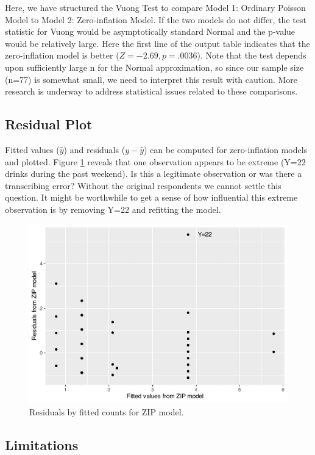 \documentclass[
]{krantz}
\begin{document}
Here, we have structured the Vuong Test to compare Model 1: Ordinary Poisson Model to Model 2: Zero-inflation Model. If the two models do not differ, the test statistic for Vuong would be asymptotically standard Normal and the p-value would be relatively large. Here the first line of the output table indicates that the zero-inflation model is better (\(Z=-2.69,p=.0036\)). Note that the test depends upon sufficiently large n for the Normal approximation, so since our sample size (n=77) is somewhat small, we need to interpret this result with caution. More research is underway to address statistical issues related to these comparisons.

\hypertarget{residual-plot}{%
\subsection{Residual Plot}\label{residual-plot}}

Fitted values (\(\hat{y}\)) and residuals (\(y-\hat{y}\)) can be computed for zero-inflation models and plotted. Figure \ref{fig:poisRes} reveals that one observation appears to be extreme (Y=22 drinks during the past weekend). Is this a legitimate observation or was there a transcribing error? Without the original respondents we cannot settle this question. It might be worthwhile to get a sense of how influential this extreme observation is by removing Y=22 and refitting the model.

\begin{figure}

{\centering \includegraphics[width=0.6\linewidth]{bookdown-BeyondMLR_files/figure-latex/poisRes-1} 

}

\caption{Residuals by fitted counts for ZIP model.}\label{fig:poisRes}
\end{figure}

\hypertarget{limitations}{%
\subsection{Limitations}\label{limitations}}
\end{document}
